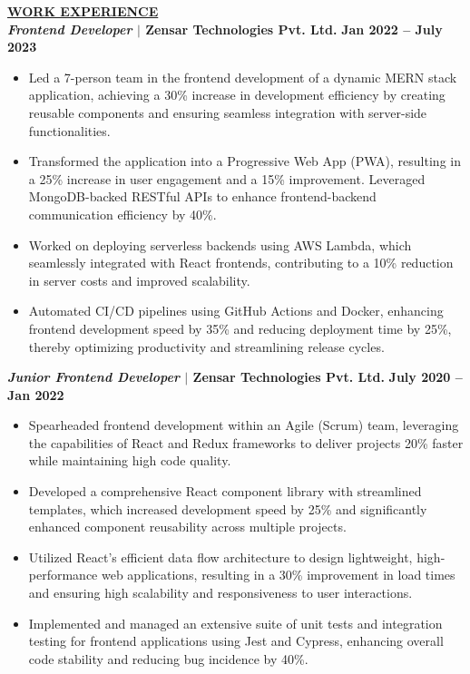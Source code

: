 \documentclass{article}
\begin{document}

\noindent \textbf{\underline{WORK EXPERIENCE}} \\
\noindent \textbf{\textit{Frontend Developer} $\mid$ Zensar Technologies Pvt. Ltd.} \hfill \textbf{Jan 2022 – July 2023}
\begin{itemize}[noitemsep,nolistsep,leftmargin=*]
\item Led a 7-person team in the frontend development of a dynamic MERN stack application, achieving a 30\% increase in development efficiency by creating reusable components and ensuring seamless integration with server-side functionalities.
\item Transformed the application into a Progressive Web App (PWA), resulting in a 25\% increase in user engagement and a 15\% improvement. Leveraged MongoDB-backed RESTful APIs to enhance frontend-backend communication efficiency by 40\%.
\item Worked on deploying serverless backends using AWS Lambda, which seamlessly integrated with React frontends, contributing to a 10\% reduction in server costs and improved scalability.
\item Automated CI/CD pipelines using GitHub Actions and Docker, enhancing frontend development speed by 35\% and reducing deployment time by 25\%, thereby optimizing productivity and streamlining release cycles.
\end{itemize}

\vspace{1mm}

\noindent \textbf{\textit{Junior Frontend Developer} $\mid$ Zensar Technologies Pvt. Ltd.} \hfill \textbf{July 2020 – Jan 2022}
\begin{itemize}[noitemsep,nolistsep,leftmargin=*]
\item Spearheaded frontend development within an Agile (Scrum) team, leveraging the capabilities of React and Redux frameworks to deliver projects 20\% faster while maintaining high code quality.
\item Developed a comprehensive React component library with streamlined templates, which increased development speed by 25\% and significantly enhanced component reusability across multiple projects.
\item Utilized React's efficient data flow architecture to design lightweight, high-performance web applications, resulting in a 30\% improvement in load times and ensuring high scalability and responsiveness to user interactions.
\item Implemented and managed an extensive suite of unit tests and integration testing for frontend applications using Jest and Cypress, enhancing overall code stability and reducing bug incidence by 40\%.\\
\end{itemize}
\end{document}

